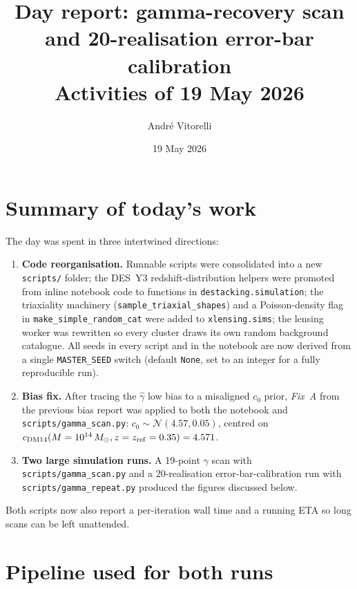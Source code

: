 \documentclass[11pt,a4paper]{article}
\title{\textbf{Day report: gamma-recovery scan and 20-realisation
error-bar calibration}\\[0.3em]
\large Activities of 19 May 2026}
\author{Andr\'e Vitorelli}
\date{19 May 2026}
\begin{document}
\maketitle

\section{Summary of today's work}

The day was spent in three intertwined directions:

\begin{enumerate}[noitemsep]
  \item \textbf{Code reorganisation.}  Runnable scripts were consolidated into
        a new \texttt{scripts/} folder; the DES~Y3 redshift-distribution
        helpers were promoted from inline notebook code to functions in
        \texttt{destacking.simulation}; the triaxiality machinery
        (\texttt{sample\_triaxial\_shapes}) and a Poisson-density flag in
        \texttt{make\_simple\_random\_cat} were added to
        \texttt{xlensing.sims}; the lensing worker was rewritten so every
        cluster draws its own random background catalogue.  All seeds in
        every script and in the notebook are now derived from a single
        \texttt{MASTER\_SEED} switch (default \texttt{None}, set to an
        integer for a fully reproducible run).
  \item \textbf{Bias fix.}  After tracing the
        $\hat\gamma$ low bias to a misaligned $c_0$ prior, \emph{Fix~A} from
        the previous bias report was applied to both the notebook and
        \texttt{scripts/gamma\_scan.py}: $c_0 \sim \mathcal{N}(4.57, 0.05)$,
        centred on $c_{\rm DM14}(M=10^{14}\,M_\odot, z=z_{\rm ref}=0.35) = 4.571$.
  \item \textbf{Two large simulation runs.}  A 19-point $\gamma$ scan with
        \texttt{scripts/gamma\_scan.py} and a 20-realisation
        error-bar-calibration run with \texttt{scripts/gamma\_repeat.py}
        produced the figures discussed below.
\end{enumerate}

Both scripts now also report a per-iteration wall time and a running ETA so
long scans can be left unattended.

\section{Pipeline used for both runs}
\end{document}
